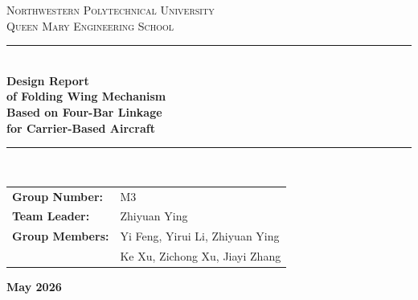 \documentclass[11pt,a4paper]{article}
\begin{document}
\begin{titlepage}
    \thispagestyle{empty}
    \centering
    \vspace*{0.5cm}
    
    {\LARGE \textsc{Northwestern Polytechnical University}} \\[0.3cm]
    {\Large \textsc{Queen Mary Engineering School}} \\[2.5cm]
    
    \rule{\textwidth}{1.5pt} \\[0.8cm]
    
    {\Huge \textbf{Design Report}} \\[0.4cm]
    {\huge \textbf{of Folding Wing Mechanism}} \\[0.4cm]
    {\huge \textbf{Based on Four-Bar Linkage}} \\[0.4cm]
    {\huge \textbf{for Carrier-Based Aircraft}} \\[0.6cm]
    
    \rule{\textwidth}{1.5pt} \\[2.5cm]
    
    \begin{minipage}{0.7\textwidth}
        \Large
        \renewcommand{\arraystretch}{1.5}
        \begin{tabular}{@{}l l@{}}
            \textbf{Group Number:} & M3 \\
            \textbf{Team Leader:} & Zhiyuan Ying \\
            \textbf{Group Members:} & Yi Feng, Yirui Li, Zhiyuan Ying \\
                                    & Ke Xu, Zichong Xu, Jiayi Zhang \\
        \end{tabular}
    \end{minipage}
    
    \vfill
    
    {\Large \textbf{May 2026}} \\[1cm]

\end{titlepage}
\end{document}
